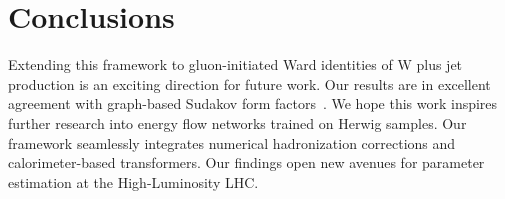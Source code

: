\section{Conclusions}\label{sec:conclusions}

Extending this framework to gluon-initiated Ward identities of W plus
jet production is an exciting direction for future work. Our results are
in excellent agreement with graph-based Sudakov form
factors~\cite{TPC:1791-The-Mellin-Moment-Awakens-September-30-2026}. We
hope this work inspires further research into energy flow networks
trained on Herwig samples. Our framework seamlessly integrates numerical
hadronization corrections and calorimeter-based transformers. Our
findings open new avenues for parameter estimation at the
High-Luminosity LHC.

